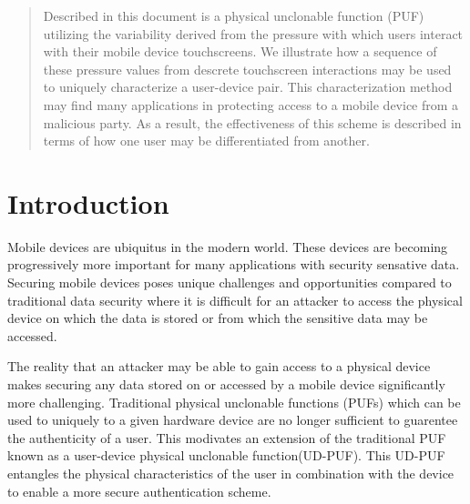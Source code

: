 \documentclass{acm_proc_article-sp}
\begin{document}

\maketitle
\begin{abstract}
Described in this document is a physical unclonable function (PUF) utilizing the variability derived from the pressure with which users interact with their mobile device touchscreens. We illustrate how a sequence of these pressure values from descrete touchscreen interactions may be used to uniquely characterize a user-device pair. This characterization method may find many applications in protecting access to a mobile device from a malicious party. As a result, the effectiveness of this scheme is described in terms of how one user may be differentiated from another.
\end{abstract}




\section{Introduction}
\label{sec:intro}
Mobile devices are ubiquitus in the modern world. These devices are becoming progressively more important for many applications with security sensative data. 
Securing mobile devices poses unique challenges and opportunities compared to traditional data security where it is difficult for an attacker to access the physical device on which the data is stored or from which the sensitive data may be accessed.
%

The reality that an attacker may be able to gain access to a physical device makes securing any data stored on or accessed by a mobile device significantly more challenging. Traditional physical unclonable functions (PUFs) which can be used to uniquely to a given hardware device are no longer sufficient to guarentee the authenticity of a user.
%
This modivates an extension of the traditional PUF known as a user-device physical unclonable function(UD-PUF). This UD-PUF entangles the physical characteristics of the user in combination with the device to enable a more secure authentication scheme.
\end{document}
